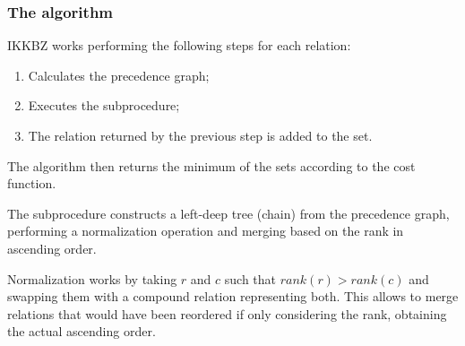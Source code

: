 \subsubsection{The algorithm}
IKKBZ works performing the following steps for each relation:
\begin{enumerate}
	\item Calculates the precedence graph;
	\item Executes the subprocedure;
	\item The relation returned by the previous step is added to the set.
\end{enumerate}
The algorithm then returns the minimum of the sets according to the cost function.

The subprocedure constructs a left-deep tree (chain) from the precedence graph, performing a normalization operation and merging based on the rank in ascending order.

Normalization works by taking $r$ and $c$ such that $rank(r) > rank(c)$ and swapping them with a compound relation representing both. This allows to merge relations that would have been reordered if only considering the rank, obtaining the actual ascending order.


